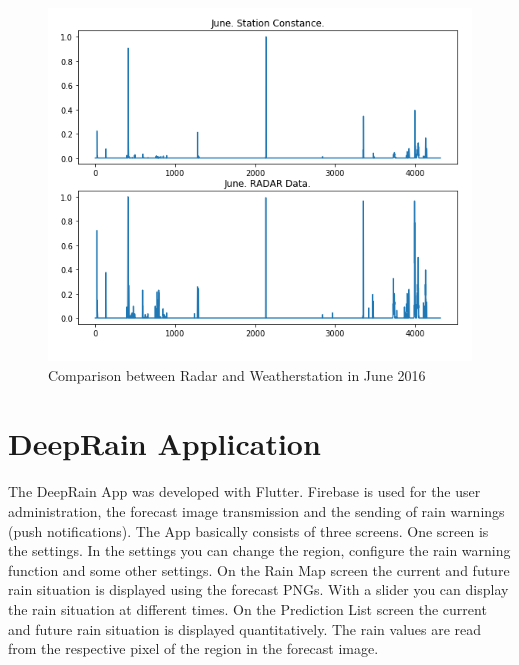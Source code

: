 \documentclass[oneside]{htwg-report}
\begin{document}
\begin{figure}[ht]
    \centering
    \includegraphics[width=1\linewidth,angle=0]{../abb/radar_station_daten_vergleich_June.png}
    \caption[Datenaufbereitung]{Comparison between Radar and Weatherstation in June 2016}
    \label{fig:radar_station_daten_vergleich_June}
\end{figure}

\section*{DeepRain Application}
    \begin{sloppypar}
        The DeepRain App was developed with Flutter. 
        Firebase is used for the user administration, the forecast image transmission and the sending of rain warnings (push notifications). 
        The App basically consists of three screens. One screen is the settings. 
        In the settings you can change the region, configure the rain warning function and some other settings.
        On the Rain Map screen the current and future rain situation is displayed using the forecast PNGs. With a slider you can display the rain situation at different times.
        On the Prediction List screen the current and future rain situation is displayed quantitatively. The rain values are read from the respective pixel of the region in the forecast image.   
    \end{sloppypar}
\end{document}
